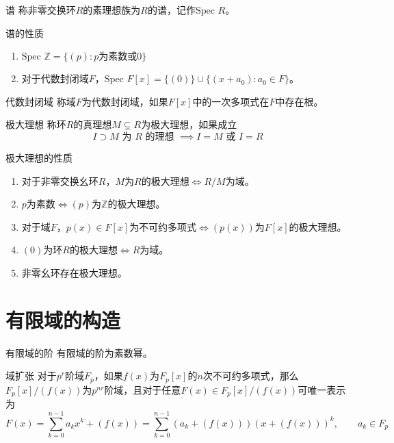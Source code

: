 \documentclass[lang = cn, scheme = chinese, thmcnt = section]{elegantbook}
\begin{document}
\begin{definition}{谱}
	称非零交换环$R$的素理想族为$R$的谱，记作$\text{Spec }R$。
\end{definition}

\begin{proposition}{谱的性质}
	\begin{enumerate}
		\item $\text{Spec }\mathbb{Z}=\{ (p):p为素数或0 \}$
		\item 对于代数封闭域$F$，$\text{Spec }F[x]=\{ (0) \}\cup\{ (x+a_0):a_0\in F \}$。
	\end{enumerate}
\end{proposition}

\begin{definition}{代数封闭域}
	称域$F$为代数封闭域，如果$F[x]$中的一次多项式在$F$中存在根。
\end{definition}

\begin{definition}{极大理想}
	称环$R$的真理想$M\subsetneq R$为极大理想，如果成立
	$$
	I\supset M\text{ 为 }R\text{ 的理想 }\implies I=M\text{ 或 }I=R
	$$
\end{definition}

\begin{proposition}{极大理想的性质}
	\begin{enumerate}
		\item 对于非零交换幺环$R$，$M$为$R$的极大理想$\iff R/M$为域。
		\item $p$为素数$\iff (p)$为$\mathbb{Z}$的极大理想。
		\item 对于域$F$，$p(x)\in F[x]$为不可约多项式$\iff (p(x))$为$F[x]$的极大理想。
		\item $(0)$为环$R$的极大理想$\iff R$为域。
		\item 非零幺环存在极大理想。
	\end{enumerate}
\end{proposition}

\section{有限域的构造}

\begin{theorem}{有限域的阶}
	有限域的阶为素数幂。
\end{theorem}

\begin{theorem}{域扩张}
	对于$p^r$阶域$F_p$，如果$f(x)$为$F_p[x]$的$n$次不可约多项式，那么$F_p[x]/(f(x))$为$p^{nr}$阶域，且对于任意$F(x)\in F_p[x]/(f(x))$可唯一表示为
	$$
	F(x)=\sum_{k=0}^{n-1}a_kx^k+(f(x))=\sum_{k=0}^{n-1}(a_k+(f(x)))(x+(f(x)))^k,\qquad a_k\in F_p
	$$
\end{theorem}
\end{document}

